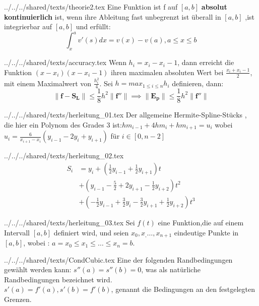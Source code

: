 \begin{filecontents*}[overwrite]{../../../shared/texts/theorie2.tex}
Eine Funktion ist f auf \([a, b]\) \textbf{absolut kontinuierlich} ist, wenn ihre Ableitung fast unbegrenzt ist überall in  \([a, b]\) ,ist integrierbar auf \([a, b]\) und erfüllt:
\[\int_x^a v'(s) dx = v(x)-v(a) ,a \leq x\leq b\]
\end{filecontents*}

\begin{filecontents*}[overwrite]{../../../shared/texts/accuracy.tex}
Wenn  \(h_i=x_i -x_i-1\), dann erreicht die Funktion \((x-x_i)(x-x_i-1)\)
ihren maximalen absoluten Wert bei \(\frac{x_i+x_i-1}{2}\), mit einem
Maximalwert von \(\frac{h_i^2}{4}\). Sei \(h=max_{1\leq i\leq n} h_i\)
definieren, dann:\[ \lVert \mathbf{f-S_L} \rVert \leq \frac{1}{8}h^2 
\lVert \mathbf{f''} \rVert  \implies \lVert \mathbf{E_p} \rVert \leq \frac{1}{8}h^2 
\lVert \mathbf{f''} \rVert \]
\end{filecontents*}

\begin{filecontents*}[overwrite]{../../../shared/texts/herleitung_01.tex}
Der allgemeine Hermite-Spline-Stücks , die hier ein Polynom des Grades 
3 ist:\(hm_{i−1}+4hm_i+hm_{i+1}=u_i\)
wobei \(u_i=\frac{6}{x_{i+1}-x_i}(y_{i-1}-2y_i+y_{i+1})\)
für \(i \in [0 ,n-2]\)
\end{filecontents*}

\begin{filecontents*}[overwrite]{../../../shared/texts/herleitung_02.tex}
\begin{equation*}
\begin{split}
S_i &= y_i + (\frac{1}{2}y_{i-1}+\frac{1}{2}y_{i+1})t \\
&+ (y_{i-1}-\frac{5}{2}+2y_{i+1}-\frac{1}{2}y_{i+2})t^2 \\
&+ (-\frac{1}{2}y_{i-1}+\frac{3}{2}y_i-\frac{3}{2}y_{i+1}+\frac{1}{2}y_{i+2})t^3
\end{split}
\end{equation*}
\end{filecontents*}

\begin{filecontents*}[overwrite]{../../../shared/texts/herleitung_03.tex}
Sei \(f(t)\) eine Funktion,die auf einem Intervall \([a , b]\) definiert 
wird, und seien \(x_0,x_,\dots,x_{n + 1}\) eindeutige Punkte in \([a,b]\), 
wobei :  \(a = x_0 \leq x_1 \leq \dots \leq x_n = b\).
\end{filecontents*}

\begin{filecontents*}[overwrite]{../../../shared/texts/CondCubic.tex}
Eine der folgenden Randbedingungen gewählt werden kann:
\(s''(a)=s''(b)=0\), was als natürliche Randbedingungen bezeichnet wird.\\
\(s'(a)=f'(a) , s'(b)=f'(b)\), genannt die Bedingungen an den festgelegten
Grenzen.
\end{filecontents*} 

